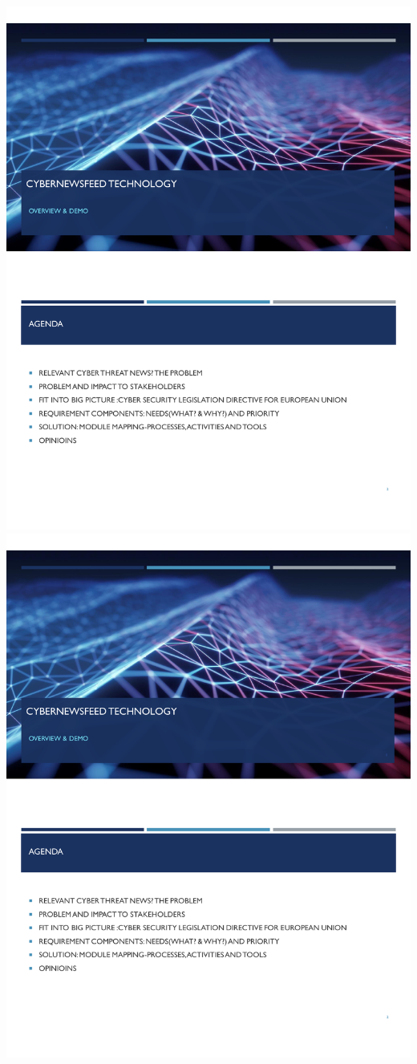 \includegraphics[page=3,scale=0.75]{Appendices/GSS-Threat Brief PPT.pdf} 
\includegraphics[page=4,scale=0.75]{Appendices/GSS-Threat Brief PPT.pdf} 
